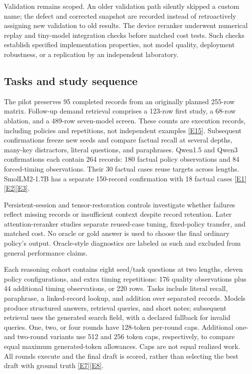 \documentclass[11pt,letterpaper]{article}
\newcommand{\ev}[1]{\hyperref[app:evidence]{[E#1]}}
\newcommand{\code}[1]{\texttt{\detokenize{#1}}}
\begin{document}
Validation remains scoped. An older validation path silently skipped a custom \code{full_buffered} name; the defect and corrected snapshot are recorded instead of retroactively assigning new validation to old results. The device reranker underwent numerical replay and tiny-model integration checks before matched cost tests. Such checks establish specified implementation properties, not model quality, deployment robustness, or a replication by an independent laboratory.

\subsection{Tasks and study sequence}
The pilot preserves 95 completed records from an originally planned 255-row matrix. Follow-up demand retrieval comprises a 123-row first study, a 68-row ablation, and a 489-row seven-model screen. These counts are execution records, including policies and repetitions, not independent examples \ev{15}. Subsequent confirmations freeze new seeds and compare factual recall at several depths, many-key distractors, literal questions, and paraphrases. Qwen1.5 and Qwen3 confirmations each contain 264 records: 180 factual policy observations and 84 forced-timing observations. Their 30 factual cases reuse targets across lengths. SmolLM2-1.7B has a separate 150-record confirmation with 18 factual cases \ev{1}\ev{2}\ev{3}.

Persistent-session and tensor-restoration controls investigate whether failures reflect missing records or insufficient context despite record retention. Later attention-reranker studies separate reused-case tuning, fixed-policy transfer, and matched cost. No oracle or gold answer is used to choose the final ordinary policy's output. Oracle-style diagnostics are labeled as such and excluded from general performance claims.

Each reasoning cohort contains eight seed/task questions at two lengths, eleven policy configurations, and extra timing repetitions: 176 quality observations plus 44 additional timing observations, or 220 rows. Tasks include literal recall, paraphrase, a linked-record lookup, and addition over separated records. Models produce structured answers, retrieval queries, and short notes; subsequent retrieval uses the generated search field, with a declared fallback for invalid queries. One, two, or four rounds have 128-token per-round caps. Additional one- and two-round variants use 512 and 256 token caps, respectively, to compare equal maximum generated-token allowances. Caps are not equal realized work. All rounds execute and the final draft is scored, rather than selecting the best draft with ground truth \ev{7}\ev{8}.
\end{document}
